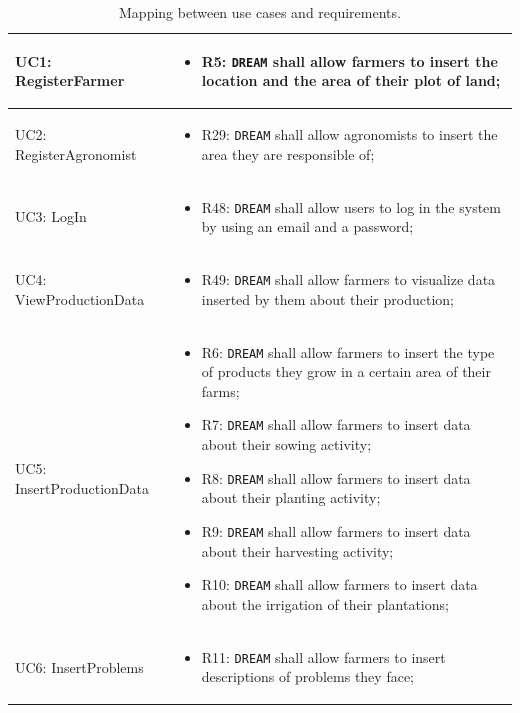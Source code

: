 \documentclass{article}
\begin{document}
\begin{longtable}[c]{|m{}|m{8cm}|}
\caption{Mapping between use cases and requirements.}
 \label{Mapping UC - R}
  \hline
  UC1: RegisterFarmer &
\begin{itemize}
    \item R5: \verb|DREAM| shall allow farmers to insert the location and the area of their plot of land;
\end{itemize}\\
\hline
 UC2: RegisterAgronomist &
\begin{itemize}
    \item R29: \verb|DREAM| shall allow agronomists to insert the area they are responsible of;
\end{itemize}\\
\hline
UC3: LogIn & 
\begin{itemize}
    \item R48: \verb|DREAM| shall allow users to log in the system by using an email and a password;
\end{itemize}\\
\hline
UC4: ViewProductionData & 
\begin{itemize}
    \item R49: \verb|DREAM| shall allow farmers to visualize data inserted by them about their production;
\end{itemize}\\
\hline
UC5: InsertProductionData & 
\begin{itemize}
        \item R6: \verb|DREAM| shall allow farmers to insert the type of products they grow in a certain area of their farms;

        \item R7: \verb|DREAM| shall allow farmers to insert data about their sowing activity;
    
        \item R8: \verb|DREAM| shall allow farmers to insert data about their planting activity;
        
        \item R9: \verb|DREAM| shall allow farmers to insert data about their harvesting activity;
        
        \item R10: \verb|DREAM| shall allow farmers to insert data about the irrigation of their plantations;
    \end{itemize}\\
\hline
  \item UC6: InsertProblems & 
    \begin{itemize}
        \item R11: \verb|DREAM| shall allow farmers to insert descriptions of problems they face;
    

\end{itemize}
\end{longtable}
\end{document}
